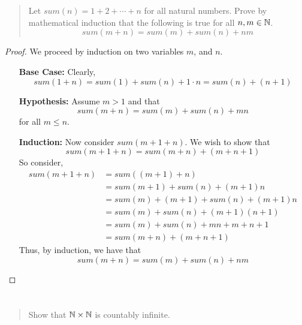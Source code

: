 \documentclass{article}
\begin{document}
\section{}
\begin{quote}
    Let $sum(n) = 1 + 2 + \cdots + n$ for all natural numbers. Prove by
    mathematical induction that the following is true for all $n, m \in \mathbb{N}$.
    \[ sum(m + n) = sum(m) + sum(n) + nm \]
\end{quote}

\begin{proof}
    We proceed by induction on two variables $m$, and $n$.
    \begin{itemize}
        \item[\textbf{Base Case:}] Clearly,
              \[sum(1 + n) = sum(1) + sum(n) + 1 \cdot n = sum(n) + (n + 1)\]
        \item[\textbf{Hypothesis:}] Assume $m > 1$ and that
              \[sum(m + n) = sum(m) + sum(n) + mn\]
              for all $m \leq n$.
        \item[\textbf{Induction:}] Now consider $sum(m + 1 + n)$. We wish to show that
              \[sum(m + 1 + n) = sum(m + n) + (m + n + 1)\]
              So consider,
              \begin{align*}
                  sum(m + 1 + n) & = sum((m + 1) + n)                     \\
                                 & = sum(m + 1) + sum(n) + (m + 1)n       \\
                                 & = sum(m) + (m + 1) + sum(n) + (m + 1)n \\
                                 & = sum(m) + sum(n) + (m + 1)(n + 1)     \\
                                 & = sum(m) + sum(n) + mn + m + n + 1     \\
                                 & = sum(m + n) + (m + n + 1)
              \end{align*}
              Thus, by induction, we have that
              \[sum(m + n) = sum(m) + sum(n) + nm\]
    \end{itemize}
\end{proof}

\section{}
\begin{quote}
    Show that $\mathbb{N} \times \mathbb{N}$ is countably infinite.
\end{quote}
\end{document}
